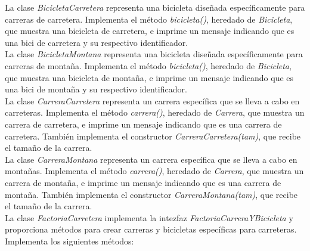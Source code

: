 \documentclass{article} %
\begin{document}
    \hspace*{1cm}La clase \textit{BicicletaCarretera} representa una bicicleta diseñada específicamente para
    carreras de carretera. Implementa el método \textit{bicicleta()}, heredado de \textit{Bicicleta}, que muestra una bicicleta de carretera,
    e imprime un mensaje indicando que es una bici de carretera y su respectivo identificador. \\

    \hspace*{1cm}La clase \textit{BicicletaMontana} representa una bicicleta diseñada específicamente para
    carreras de montaña. Implementa el método \textit{bicicleta()}, heredado de \textit{Bicicleta}, que muestra una bicicleta de montaña,
    e imprime un mensaje indicando que es una bici de montaña y su respectivo identificador.\\
    
    \hspace*{1cm}La clase \textit{CarreraCarretera} representa un carrera específica que se lleva a cabo en carreteras.
    Implementa el método \textit{carrera()}, heredado de \textit{Carrera}, que muestra un carrera de carretera, 
    e imprime un mensaje indicando que es una carrera de carretera. También implementa el constructor \textit{CarreraCarretera(tam)}, 
    que recibe el tamaño de la carrera. \\

    \hspace*{1cm}La clase \textit{CarreraMontana} representa un carrera específica que se lleva a cabo en montañas.
    Implementa el método \textit{carrera()}, heredado de \textit{Carrera}, que muestra un carrera de montaña, 
    e imprime un mensaje indicando que es una carrera de montaña. También implementa el constructor \textit{CarreraMontana(tam)}, 
    que recibe el tamaño de la carrera. \\

    \hspace*{1cm}La clase \textit{FactoriaCarretera} implementa la intezfaz \textit{FactoriaCarreraYBicicleta} y proporciona métodos
    para crear carreras y bicicletas específicas para carreteras. Implementa los siguientes métodos:
\end{document}
